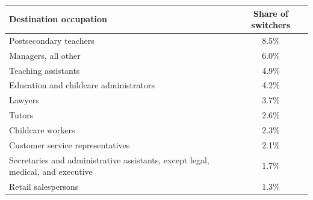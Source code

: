 \begin{tabular}{lc}
\toprule
Destination occupation & Share of switchers \\
\midrule
Postsecondary teachers & 8.5\% \\
Managers, all other & 6.0\% \\
Teaching assistants & 4.9\% \\
Education and childcare administrators & 4.2\% \\
Lawyers & 3.7\% \\
Tutors & 2.6\% \\
Childcare workers & 2.3\% \\
Customer service representatives & 2.1\% \\
Secretaries and administrative assistants, except legal, medical, and executive & 1.7\% \\
Retail salespersons & 1.3\% \\
\bottomrule
\end{tabular}
